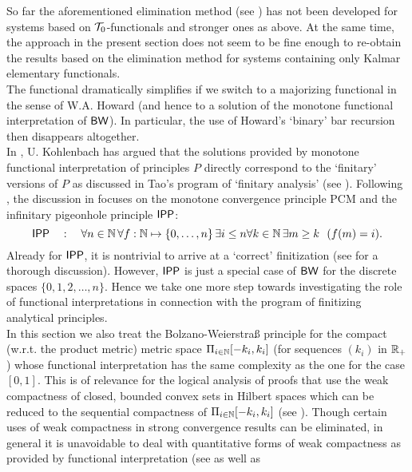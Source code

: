 So far the aforementioned elimination method (see \cite{Kohlenbach98,Kohlenbach00}) has not been 
developed for systems based on $\mathcal{T}_0$-functionals and stronger ones as above. 
At the same time, the approach in the present 
section does not seem to be fine enough 
to re-obtain the results based on the elimination method for
systems containing only Kalmar elementary 
functionals. 
\\[1mm] 
The functional dramatically simplifies if we switch to a majorizing functional 
in the sense of W.A. Howard (and hence to a solution of the monotone 
functional interpretation of $\textsf{\upshape BW}$). In particular, the use of 
Howard's `binary' bar recursion then disappears altogether. 
\\[1mm] In \cite{Kohlenbach06}, U. Kohlenbach has argued 
that the solutions provided by monotone functional interpretation 
of principles $P$ directly 
correspond to the `finitary' versions of $P$ as discussed in Tao's 
program of `finitary analysis' (see \cite{Tao07}). Following \cite{Tao07},  
the discussion in \cite{Kohlenbach06} focuses on the monotone 
convergence principle PCM and the infinitary pigeonhole principle $\textsf{\upshape IPP}$:
\[ \textsf{\upshape IPP}\quad:\quad\forall n\in\mathbb{N} \,\forall f:\mathbb{N}\mapsto\{0, \ldots, n\}
\,\exists i\leq n \forall k\in\mathbb{N}\,\exists m\geq k\ \ (f(m)=i). \] 
Already for $\textsf{\upshape IPP}$, it is nontrivial to arrive at a `correct' 
finitization (see \cite{GasparKohlenbach} for a thorough discussion). 
However, $\textsf{\upshape IPP}$ is just a special case of $\textsf{\upshape BW}$ for the discrete 
spaces $\{ 0,1,2,\ldots,n\}.$ Hence we take one more step towards  
investigating the role of functional interpretations in connection with 
the program of finitizing analytical principles. 
\\[1mm] In this section we also treat the Bolzano-Weierstra\ss{} principle for 
the compact (w.r.t. the product metric) metric space $\Pi_{i\in\mathbb{N}} 
[-k_i,k_i]$ (for sequences $(k_i)$ in $\mathbb{R}_+$) whose functional 
interpretation has the same complexity as the one for the case $[0,1].$ 
This is of relevance for the logical analysis of proofs that use the weak 
compactness of closed, bounded convex sets in Hilbert spaces which can 
be reduced to the sequential compactness of $\Pi_{i\in\mathbb{N}} 
[-k_i,k_i]$ (see \cite{KohlenbachMints,Kohlenbach(weakcompactness)}). 
Though certain uses of weak compactness in strong convergence results 
can be eliminated, in general it is unavoidable 
to deal with quantitative forms of weak compactness as provided 
by functional interpretation (see \cite{Kohlenbach(Browder)} as well as 
